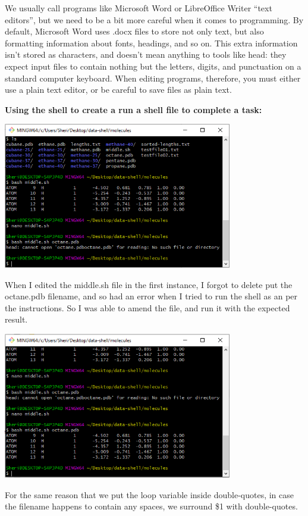 \documentclass{article}
\begin{document}
We usually call programs like Microsoft Word or LibreOffice Writer “text editors”, but we need to be a bit more careful when it comes to programming. By default, Microsoft Word uses .docx files to store not only text, but also formatting information about fonts, headings, and so on. This extra information isn’t stored as characters, and doesn’t mean anything to tools like head: they expect input files to contain nothing but the letters, digits, and punctuation on a standard computer keyboard. When editing programs, therefore, you must either use a plain text editor, or be careful to save files as plain text.

\textbf{Using the shell to create a run a shell file to complete a task:}
\label{Error: Changing a shell file}

\includegraphics[width=10cm]{Images/GitBash_054.PNG}

When I edited the middle.sh file in the first instance, I forgot to delete put the octane.pdb filename, and so had an error when I tried to run the shell as an per the instructions. 
So I was able to amend the file, and run it with the expected result.

\includegraphics[width=10cm]{Images/GitBash_055.PNG}

For the same reason that we put the loop variable inside double-quotes, in case the filename happens to contain any spaces, we surround \$1 with double-quotes.
\end{document}
